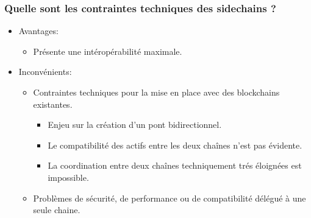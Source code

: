\begin{frame} 
  \frametitle{Quelle sont les contraintes techniques des sidechains ?} 
  \begin{itemize} 
    \item Avantages:
    \begin{itemize}
      \item Présente une intéropérabilité maximale.
    \end{itemize}
    \item Inconvénients:
    \begin{itemize}
      \item Contraintes techniques pour la mise en place avec des blockchains existantes.
      \begin{itemize}
        \item Enjeu sur la création d’un pont bidirectionnel.
        \item Le compatibilité des actifs entre les deux chaînes n'est pas évidente. 
        \item La coordination entre deux chaînes techniquement trés éloignées est impossible.
      \end{itemize}
      \item Problèmes de sécurité, de performance ou de compatibilité délégué à une seule chaine.
    \end{itemize}
  \end{itemize} 
\end{frame}